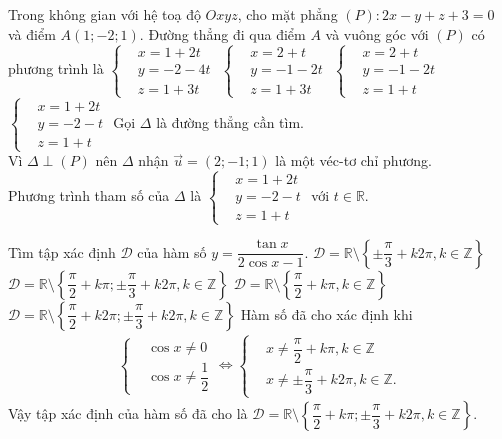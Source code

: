 \begin{ex}%
 Trong không gian với hệ toạ độ $Oxyz$, cho mặt phẳng $(P)\colon 2x-y+z+3=0$ và điểm $A(1;-2;1)$. Đường thẳng đi qua điểm $A$ và vuông góc với $(P)$ có phương trình là
 \choice
  {$\left\{\begin{aligned}&x=1+2t \\&y=-2-4t \\&z=1+3t\end{aligned}\right.$}
  {$\left\{\begin{aligned}&x=2+t \\&y=-1-2t \\&z=1+3t\end{aligned}\right.$}
  {$\left\{\begin{aligned}&x=2+t \\&y=-1-2t \\&z=1+t\end{aligned}\right.$}
  {\True $\left\{\begin{aligned}&x=1+2t \\&y=-2-t \\&z=1+t\end{aligned}\right.$}
 \loigiai
  {
  Gọi $\Delta$ là đường thẳng cần tìm.\\
  Vì $\Delta \perp (P)$ nên $\Delta$ nhận $\vec{u}=(2;-1;1)$ là một véc-tơ chỉ phương.\\
  Phương trình tham số của $\Delta$ là $\left\{\begin{aligned}&x=1+2t \\&y=-2-t \\&z=1+t\end{aligned}\right.$ với $t\in\mathbb{R}$.
  }
\end{ex}

\begin{ex}%
 Tìm tập xác định $\mathscr{D}$ của hàm số $y=\dfrac{\tan x}{2\cos x-1}$.
 \choice
  {$\mathscr{D}=\mathbb{R}\setminus\left\{\pm\dfrac{\pi}{3}+k2\pi, k\in\mathbb{Z}\right\}$}
  {\True $\mathscr{D}=\mathbb{R}\setminus\left\{\dfrac{\pi}{2}+k\pi; \pm\dfrac{\pi}{3}+k2\pi, k\in\mathbb{Z}\right\}$}
  {$\mathscr{D}=\mathbb{R}\setminus\left\{\dfrac{\pi}{2}+k\pi, k\in\mathbb{Z}\right\}$}
  {$\mathscr{D}=\mathbb{R}\setminus\left\{\dfrac{\pi}{2}+k2\pi; \pm\dfrac{\pi}{3}+k2\pi, k\in\mathbb{Z}\right\}$}
 \loigiai
  {
  Hàm số đã cho xác định khi
  \begin{eqnarray*}
   \left\{\begin{aligned}&\cos x\neq 0 \\&\cos x\neq\dfrac{1}{2}\end{aligned}\right. \Leftrightarrow \left\{\begin{aligned}&x\neq \dfrac{\pi}{2}+k\pi,k\in\mathbb{Z} \\& x\neq \pm\dfrac{\pi}{3}+k2\pi,k\in\mathbb{Z}.\end{aligned}\right.
  \end{eqnarray*}
  Vậy tập xác định của hàm số đã cho là $\mathscr{D}=\mathbb{R}\setminus\left\{\dfrac{\pi}{2}+k\pi; \pm\dfrac{\pi}{3}+k2\pi, k\in\mathbb{Z}\right\}$.
  }
\end{ex}

